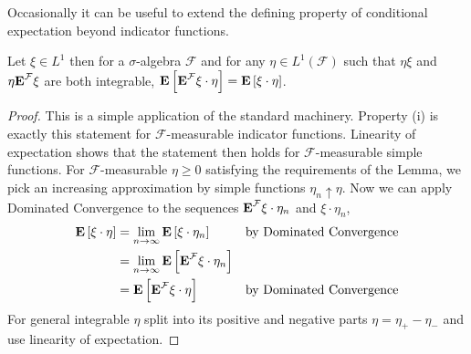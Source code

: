 Occasionally it can be useful to extend the defining property of
conditional expectation beyond indicator functions.
\begin{lem}Let $\xi \in L^1$ then for a $\sigma$-algebra $\mathcal{F}$
  and for any $\eta \in L^1(\mathcal{F})$ such that $\eta \xi$ and
  $\eta \textbf{E}^{\mathcal{F}} \xi$ are both integrable, 
  $\textbf{E}\left[\textbf{E}^{\mathcal{F}} \xi\cdot\eta\right] = \textbf{E}\left[\xi\cdot\eta\right] $.
\end{lem}
\begin{proof}
This is a simple application of the standard machinery.
Property (i) is exactly this statement for $\mathcal{F}$-measurable indicator functions.
Linearity of expectation shows that the statement then holds for
$\mathcal{F}$-measurable simple functions.  For
$\mathcal{F}$-measurable $\eta \geq 0$ satisfying the requirements of
the Lemma, we pick an increasing
approximation by simple functions $\eta_n \uparrow \eta$.
Now we can
apply Dominated Convergence to the sequences
$\textbf{E}^{\mathcal{F}} \xi \cdot \eta_n$ and $\xi \cdot \eta_n$,
\begin{align*}
\textbf{E}\left[\xi \cdot \eta\right] &= \lim_{n \to \infty} \textbf{E}\left[\xi
  \cdot \eta_n\right] & & \text{by Dominated Convergence} \\
&=\lim_{n \to \infty} \textbf{E}\left[\textbf{E}^{\mathcal{F}} \xi 
  \cdot \eta_n\right] \\
&=\textbf{E}\left[\textbf{E}^{\mathcal{F}} \xi 
  \cdot \eta\right] & & \text{by Dominated Convergence} \\
\end{align*}
For general integrable $\eta$ split into its positive and negative
parts $\eta = \eta_+ - \eta_-$ and use linearity of expectation.
\end{proof}

